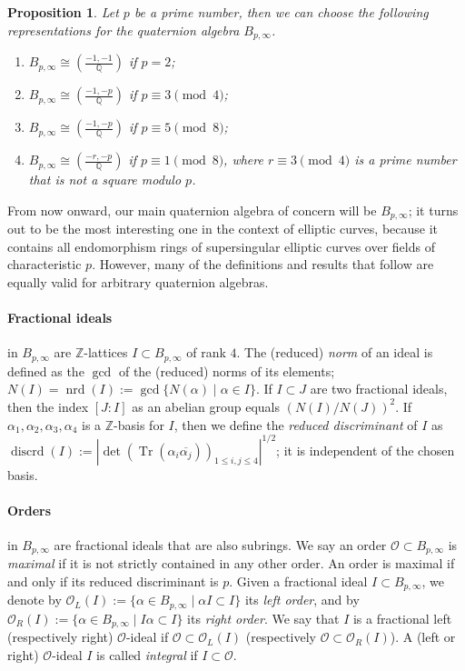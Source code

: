 \documentclass[10pt]{article}
\theoremstyle{plain}
\newtheorem{proposition}[theorem]{Proposition}
\theoremstyle{definition}
\DeclareMathOperator{\Tr}{Tr} %
\DeclareMathOperator{\nrd}{nrd} %
\DeclareMathOperator{\discrd}{discrd} %
\def\Q{\ensuremath{\mathbb{Q}}}
\def\Z{\ensuremath{\mathbb{Z}}}
\def\O{\ensuremath{\mathcal{O}}}
\begin{document}
\begin{proposition}
Let $p$ be a prime number, then we can choose the following representations
for the quaternion algebra $B_{p,\infty}$.
\begin{enumerate}
\item $B_{p,\infty} \cong \left(\frac{-1,-1}{\Q}\right)$
if $p=2$;
\item $B_{p,\infty} \cong \left(\frac{-1,-p}{\Q}\right)$
if $p\equiv 3\pmod{4}$;
\item $B_{p,\infty} \cong \left(\frac{-1,-p}{\Q}\right)$
if $p\equiv 5\pmod{8}$;
\item $B_{p,\infty} \cong \left(\frac{-r,-p}{\Q}\right)$
if $p\equiv 1\pmod{8}$, where $r\equiv 3\pmod{4}$ is a prime number
that is not a square modulo $p$.
\end{enumerate}
\end{proposition}

From now onward, our main quaternion algebra of concern will be $B_{p,\infty}$;
it turns out to be the most interesting one in the context of elliptic curves,
because it contains all endomorphism rings of supersingular elliptic curves
over fields of characteristic $p$. However, many of the definitions and results
that follow are equally valid for arbitrary quaternion algebras.


\paragraph{Fractional ideals} in $B_{p,\infty}$ are $\Z$-lattices
$I\subset B_{p,\infty}$ of rank $4$.
The (reduced) \emph{norm} of an ideal is defined as the
$\gcd$ of the (reduced) norms of its elements;
$N(I) = \nrd(I) := \gcd\{N(\alpha)\mid\alpha\in I\}$.
If $I\subset J$ are two fractional ideals, then the index $[J:I]$ as
an abelian group equals $\left(N(I)/N(J)\right)^2$.
If $\alpha_1,\alpha_2,\alpha_3,\alpha_4$ is a $\Z$-basis for $I$, then
we define the \emph{reduced discriminant} of $I$ as $\discrd(I) :=
|\det(\Tr(\alpha_i\overline{\alpha_j}))_{1\leq i,j\leq 4}|^{1/2}$;
it is independent of the chosen basis.

\paragraph{Orders} in $B_{p,\infty}$ are fractional ideals that are also
subrings. We say an order $\O\subset B_{p,\infty}$ is \emph{maximal} if
it is not strictly contained in any other order. An order is maximal
if and only if its reduced discriminant is $p$.
Given a fractional ideal $I\subset B_{p,\infty}$,
we denote by $\O_L(I):=\{\alpha\in B_{p,\infty}\mid \alpha I\subset I\}$
its \emph{left order},
and by $\O_R(I):=\{\alpha\in B_{p,\infty}\mid I\alpha\subset I\}$
its \emph{right order}.
We say that $I$ is a fractional left (respectively right) $\O$-ideal if
$\O\subset\O_L(I)$ (respectively $\O\subset\O_R(I)$).
A (left or right) $\O$-ideal $I$ is called \emph{integral} if $I\subset\O$.
\end{document}
